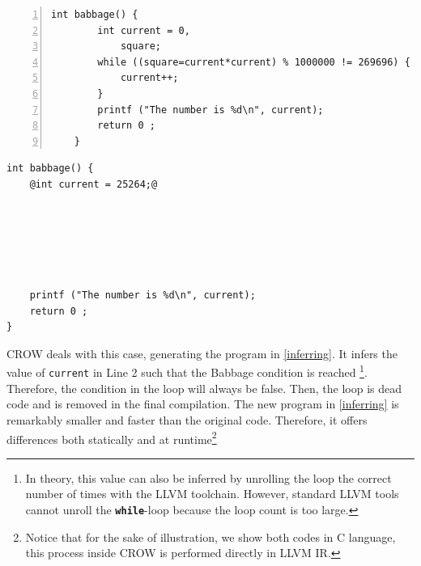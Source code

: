 {


\begin{minipage}[t]{0.43\linewidth}
    \begin{lstlisting}[numbers=left]
    int babbage() {
        int current = 0,
            square;
        while ((square=current*current) % 1000000 != 269696) {
            current++;
        }
        printf ("The number is %d\n", current);
        return 0 ;
    }
    \end{lstlisting}
\end{minipage}\hfill
\begin{minipage}[t]{0.44\linewidth}
    \begin{lstlisting}[]
int babbage() {
    @int current = 25264;@
    
    




    printf ("The number is %d\n", current);
    return 0 ;
}
    \end{lstlisting}
\end{minipage}
}

CROW deals with this case, generating the program in \autoref{inferring}. It infers the value of \texttt{current} in Line 2 such that the Babbage condition is reached \footnote{
    In theory, this value can also be inferred by unrolling the loop the correct number of times with the LLVM toolchain.
    However, standard LLVM tools cannot unroll the \texttt{\textbf{while}}-loop because the loop count is too large.}. 
Therefore, the condition in the loop will always be false. Then, the loop is dead code and is removed in the final compilation. 
The new program in \autoref{inferring} is remarkably smaller and faster than the original code. Therefore, it offers differences both statically and at runtime\footnote{ Notice that for the sake of illustration, we show both codes in C language, this process inside CROW is performed directly in LLVM IR.}



